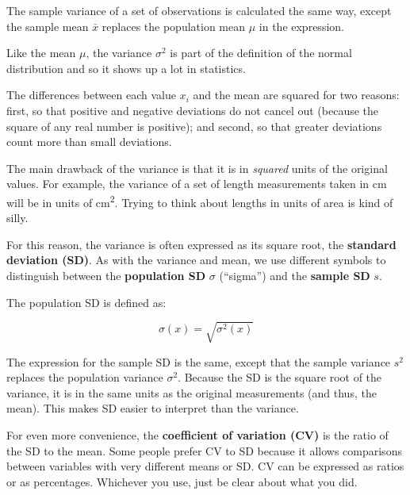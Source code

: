 \documentclass[
  13,
  letterpaper,
]{report}
\begin{document}
The sample variance of a set of observations is calculated the same way,
except the sample mean \(\bar{x}\) replaces the population mean \(\mu\)
in the expression.

Like the mean \(\mu\), the variance \(\sigma^2\) is part of the
definition of the normal distribution and so it shows up a lot in
statistics.

The differences between each value \(x_i\) and the mean are squared for
two reasons: first, so that positive and negative deviations do not
cancel out (because the square of any real number is positive); and
second, so that greater deviations count more than small deviations.

The main drawback of the variance is that it is in \emph{squared} units
of the original values. For example, the variance of a set of length
measurements taken in cm will be in units of cm\textsuperscript{2}.
Trying to think about lengths in units of area is kind of silly.

For this reason, the variance is often expressed as its square root, the
\textbf{standard deviation (SD)}. As with the variance and mean, we use
different symbols to distinguish between the \textbf{population SD}
\(\sigma\) (``sigma'') and the \textbf{sample SD} \(s\).

The population SD is defined as:

\[\sigma\left(x\right)=\sqrt{\sigma^2\left(x\right)}\]

The expression for the sample SD is the same, except that the sample
variance \(s^2\) replaces the population variance \(\sigma^2\). Because
the SD is the square root of the variance, it is in the same units as
the original measurements (and thus, the mean). This makes SD easier to
interpret than the variance.

For even more convenience, the \textbf{coefficient of variation (CV)} is
the ratio of the SD to the mean. Some people prefer CV to SD because it
allows comparisons between variables with very different means or SD. CV
can be expressed as ratios or as percentages. Whichever you use, just be
clear about what you did.
\end{document}
